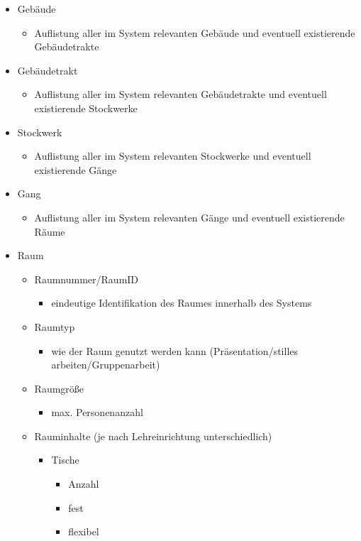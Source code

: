 \begin{itemize}
	\item Gebäude
	\begin{itemize}
		\item Auflistung aller im System relevanten Gebäude und eventuell existierende Gebäudetrakte
	\end{itemize}
	\item Gebäudetrakt
	\begin{itemize}
		\item Auflistung aller im System relevanten Gebäudetrakte und eventuell existierende Stockwerke
	\end{itemize}
	\item Stockwerk
	\begin{itemize}
		\item Auflistung aller im System relevanten Stockwerke und eventuell existierende Gänge
	\end{itemize}
	\item Gang
	\begin{itemize}
		\item Auflistung aller im System relevanten Gänge und eventuell existierende Räume
	\end{itemize}
	\item Raum
	\begin{itemize}
		\item Raumnummer/RaumID
		\begin{itemize}
			\item eindeutige Identifikation des Raumes innerhalb des Systems
		\end{itemize}
		\item Raumtyp
		\begin{itemize}
			\item wie der Raum genutzt werden kann (Präsentation/stilles arbeiten/Gruppenarbeit)
		\end{itemize}
		\item Raumgröße
		\begin{itemize}
			\item max. Personenanzahl
		\end{itemize}
		\item Rauminhalte (je nach Lehreinrichtung unterschiedlich)
		\begin{itemize}
			\item Tische
			\begin{itemize}
				\item Anzahl
				\item fest
				\item flexibel

\end{itemize}
\end{itemize}
\end{itemize}
\end{itemize}
